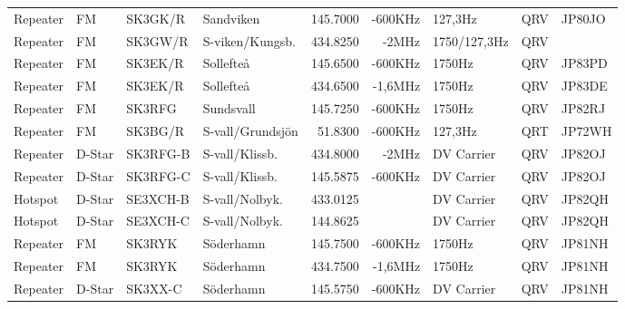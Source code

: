 \begin{landscape}
\begin{longtable}{llllrrlcl}
	Repeater                  & FM            & SK3GK/R       & Sandviken           & 145.7000          & -600KHz        & 127,3Hz          & QRV             & JP80JO           \\
	Repeater                  & FM            & SK3GW/R       & S-viken/Kungsb.     & 434.8250          & -2MHz          & 1750/127,3Hz     & QRV             & \\
	Repeater                  & FM            & SK3EK/R       & Sollefteå           & 145.6500          & -600KHz        & 1750Hz           & QRV             & JP83PD           \\
	Repeater                  & FM            & SK3EK/R       & Sollefteå           & 434.6500          & -1,6MHz        & 1750Hz           & QRV             & JP83DE           \\
	Repeater                  & FM            & SK3RFG        & Sundsvall           & 145.7250          & -600KHz        & 1750Hz           & QRV             & JP82RJ           \\
	Repeater                  & FM            & SK3BG/R       & S-vall/Grundsjön    & 51.8300           & -600KHz        & 127,3Hz          & QRT             & JP72WH           \\
	Repeater                  & D-Star        & SK3RFG-B      & S-vall/Klissb.      & 434.8000          & -2MHz          & DV Carrier       & QRV             & JP82OJ           \\
	Repeater                  & D-Star        & SK3RFG-C      & S-vall/Klissb.      & 145.5875          & -600KHz        & DV Carrier       & QRV             & JP82OJ           \\
	Hotspot                   & D-Star        & SE3XCH-B      & S-vall/Nolbyk.      & 433.0125          &                & DV Carrier       & QRV             & JP82QH           \\
	Hotspot                   & D-Star        & SE3XCH-C      & S-vall/Nolbyk.      & 144.8625          &                & DV Carrier       & QRV             & JP82QH           \\
	Repeater                  & FM            & SK3RYK        & Söderhamn           & 145.7500          & -600KHz        & 1750Hz           & QRV             & JP81NH           \\
	Repeater                  & FM            & SK3RYK        & Söderhamn           & 434.7500          & -1,6MHz        & 1750Hz           & QRV             & JP81NH           \\
	Repeater                  & D-Star        & SK3XX-C       & Söderhamn           & 145.5750          & -600KHz        & DV Carrier       & QRV             & JP81NH           \\

\end{longtable}
\end{landscape}
